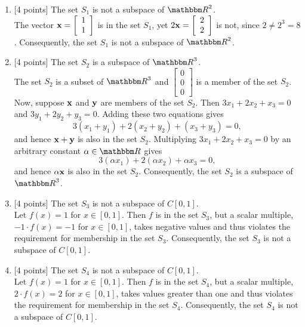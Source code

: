 \begin{solution}
\begin{enumerate}
\item {[4 points]} The set $S_1$ is not a subspace of $\R^2$.\\
The vector $\displaystyle{{\bf x}= \left[\begin{array}{c}1\\ 1\end{array}\right]}$  is in the set $S_1$, yet $\displaystyle{2{\bf x}= \left[\begin{array}{c}2\\ 2\end{array}\right]}$ is not, since $2 \ne 2^3 = 8$. Consequently, the set $S_1$ is not a subspace of $\R^2$.
\\
\item {[4 points]} The set $S_2$ is a subspace of $\R^3$.\\
The set $S_2$ is a subset of $\R^3$ and $\left[\begin{array}{c} 0 \\ 0 \\ 0\end{array}\right]$ is a member of the set $S_2$. Now, suppose ${\bf x}$ and ${\bf y}$ are members of the set $S_2$. Then $3x_1 + 2x_2 + x_3 = 0$ and  $3y_1 + 2y_2 + y_3 = 0$. Adding these two equations gives
\[
 3(x_1+y_1) + 2(x_2+y_2) + (x_3+y_3) = 0,
\]
and hence ${\bf x} + {\bf y}$ is also in the set $S_2$. Multiplying $3x_1 + 2x_2 + x_3 = 0$ by an arbitrary constant $\alpha\in\R$ gives
\[
3(\alpha x_1) + 2(\alpha x_2) + \alpha x_3 = 0,
\]
and hence $\alpha {\bf x}$ is also in the set $S_2$. Consequently, the set $S_2$ is a subspace of $\R^3$.
\\
\item {[4 points]} The set $S_3$ is not a subspace of $C[0,1]$.\\
Let $f(x) = 1$ for $x\in[0,1]$. Then $f$ is in the set $S_3$, but a scalar multiple, $-1\cdot f(x) = -1$ for $x\in[0,1]$, takes negative values and thus violates the requirement for membership in the set $S_3$. Consequently, the set $S_3$ is not a subspace of $C[0,1]$.
\\
\item {[4 points]} The set $S_4$ is not a subspace of $C[0,1]$.\\
Let $f(x) = 1$ for $x\in[0,1]$. Then $f$ is in the set $S_4$, but a scalar multiple, $2\cdot f(x) = 2$ for $x\in[0,1]$, takes values greater than one and thus violates the requirement for membership in the set $S_4$. Consequently, the set $S_4$ is not a subspace of $C[0,1]$.

\end{enumerate}
\end{solution}
